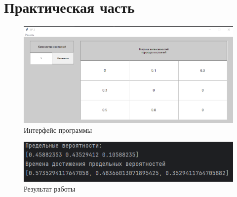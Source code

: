 \chapter{Практическая часть}

\begin{figure}[ht!]
	\centering
	\includegraphics[width=0.8\linewidth]{img/int.png}
	\caption{Интерфейс программы}
	\label{ex:int}
\end{figure}

\begin{figure}[ht!]
	\centering
	\includegraphics[width=0.8\linewidth]{img/res.png}
	\caption{Результат работы}
	\label{ex:res}
\end{figure}
